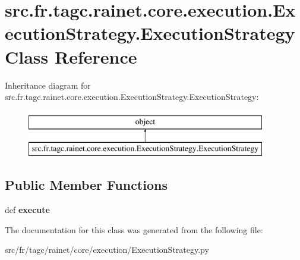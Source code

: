 \hypertarget{classsrc_1_1fr_1_1tagc_1_1rainet_1_1core_1_1execution_1_1ExecutionStrategy_1_1ExecutionStrategy}{\section{src.\-fr.\-tagc.\-rainet.\-core.\-execution.\-Execution\-Strategy.\-Execution\-Strategy Class Reference}
\label{classsrc_1_1fr_1_1tagc_1_1rainet_1_1core_1_1execution_1_1ExecutionStrategy_1_1ExecutionStrategy}
}
Inheritance diagram for src.\-fr.\-tagc.\-rainet.\-core.\-execution.\-Execution\-Strategy.\-Execution\-Strategy\-:\begin{figure}[H]
\begin{center}
\leavevmode
\includegraphics[height=2.000000cm]{classsrc_1_1fr_1_1tagc_1_1rainet_1_1core_1_1execution_1_1ExecutionStrategy_1_1ExecutionStrategy}
\end{center}
\end{figure}
\subsection*{Public Member Functions}
\begin{DoxyCompactItemize}
\item 
\hypertarget{classsrc_1_1fr_1_1tagc_1_1rainet_1_1core_1_1execution_1_1ExecutionStrategy_1_1ExecutionStrategy_afaf8d52a0852fc7f8aa501f376f4e5dd}{def {\bfseries execute}}\label{classsrc_1_1fr_1_1tagc_1_1rainet_1_1core_1_1execution_1_1ExecutionStrategy_1_1ExecutionStrategy_afaf8d52a0852fc7f8aa501f376f4e5dd}

\end{DoxyCompactItemize}


The documentation for this class was generated from the following file\-:\begin{DoxyCompactItemize}
\item 
src/fr/tagc/rainet/core/execution/Execution\-Strategy.\-py\end{DoxyCompactItemize}

